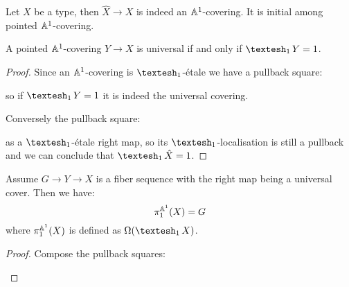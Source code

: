 \begin{proposition}
  Let $X$ be a type, then $\hat{X}\to X$ is indeed an $\mathbb{A}^1$-covering. It is initial among pointed $\mathbb{A}^1$-covering.
\end{proposition}

\begin{proposition}\label{universal-cover-contractible}
A pointed $\mathbb{A}^1$-covering $Y\to X$ is universal if and only if $\shape_1 Y = 1$.
\end{proposition}

\begin{proof}
Since an $\mathbb{A}^1$-covering is $\shape_1$-étale we have a pullback square:
  \begin{center}
  \end{center}
  so if $\shape_1Y = 1$ it is indeed the universal covering.
  
  Conversely the pullback square:
    \begin{center}
  \end{center}
  as a $\shape_1$-étale right map, so its $\shape_1$-localisation is still a pullback and we can conclude that $\shape_1\hat{X} = 1$.
\end{proof}

\begin{proposition}\label{universal-cover-pi1}
Assume $G\to Y\to X$ is a fiber sequence with the right map being a universal cover. Then we have:
\[\pi_1^{\mathbb{A}^1}(X) = G\]
where $\pi_1^{\mathbb{A}^1}(X)$ is defined as $\Omega (\shape_1 X)$.
\end{proposition}

\begin{proof}
Compose the pullback squares:
    \begin{center}
  \end{center}
\end{proof}

